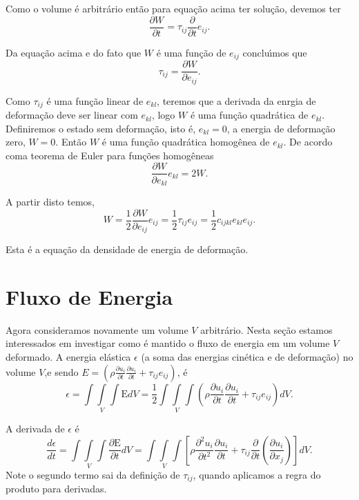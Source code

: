 Como o volume \'e arbitr\'ario ent\~ao para equa\c{c}\~ao acima ter solu\c{c}\~ao, devemos ter
\[\frac{\partial W}{\partial t} =\tau_{ij}\frac{\partial}{\partial t}e_{ij}.\]

Da equa\c{c}\~ao acima e do fato que $W$ \'e uma fun\c{c}\~ao de $e_{ij}$ conclu\'\i mos que
\[ \tau_{ij}=\frac{\partial W}{\partial e_{ij}}.\]

Como $\tau_{ij}$ \'e uma fun\c{c}\~ao linear de $e_{kl}$, teremos que a derivada da enrgia de deforma\c{c}\~ao
deve ser linear com $e_{kl}$, logo $W$ \'e uma fun\c{c}\~ao quadr\'atica de $e_{kl}$. Definiremos
o estado sem deforma\c{c}\~ao, isto \'e, $e_{kl}=0$, a energia de deforma\c{c}\~ao zero, $W=0$. Ent\~ao
$W$ \'e uma fun\c{c}\~ao quadr\'atica homog\^enea de $e_{kl}$. De acordo coma teorema de Euler
para fun\c{c}\~oes homog\^eneas
\[\frac{\partial W}{\partial e_{kl}}e_{kl}=2W.\]

A partir disto temos,
\[W=\frac{1}{2}\frac{\partial W}{\partial e_{ij}}e_{ij}=\frac{1}{2}\tau_{ij}e_{ij}=
\frac{1}{2}c_{ijkl}e_{kl}e_{ij}.\]

Esta \'e a equa\c{c}\~ao da densidade de energia de deforma\c{c}\~ao.

\section{Fluxo de Energia}

Agora consideramos novamente um volume $V$ arbitr\'ario. Nesta
se\c{c}\~ao estamos interessados em investigar como \'e mantido o
fluxo de energia  em um volume $V$ deformado. A energia el\'astica $\epsilon$ (a soma das energias
cin\'etica e de deforma\c{c}\~ao) no volume $V$,e sendo $E=(
\rho\frac{\partial u_{i}}{\partial t}\frac{\partial u_{i}}{\partial t}+\tau_{ij}e_{ij})$, \'e
\[\epsilon=\int \! \!\int\limits_{V} \! \!\int \mbox{E}dV=\frac{1}{2}\int \! \!\int\limits_{V} \! \!\int\left(
\rho\frac{\partial u_{i}}{\partial t}\frac{\partial u_{i}}{\partial t}+\tau_{ij}e_{ij}\right)dV.\]

A derivada de $\epsilon$ \'e
\[\frac{d\epsilon}{dt}=\int \! \!\int\limits_{V} \! \!\int \frac{\partial \mbox{E}}{\partial t}dV=
\int \! \!\int\limits_{V} \! \!\int \left[\rho\frac{\partial^{2}
u_{i}}{\partial t^{2}} \frac{\partial u_{i}}{\partial t}+\tau_{ij}
\frac{\partial}{\partial t}\left(\frac{\partial u_{i}}{\partial
x_{j}}\right)\right]dV.\]
Note o segundo termo sai da defini\c{c}\~ao de $\tau_{ij}$, quando aplicamos a regra do produto para derivadas.

